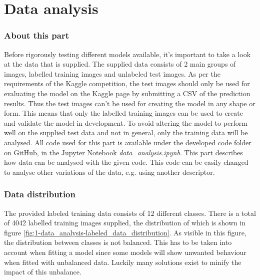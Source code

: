 \part{Data analysis}
\label{part:data_analysis}


\section{About this part}
\label{section:DA_about_part}
Before rigorously testing different models available, it's important to take a look at the data that is supplied. The supplied data consists of 2 main groups of images, labelled training images and unlabeled test images.
As per the requirements of the Kaggle competition, the test images should only be used for evaluating the model on the Kaggle page by submitting a CSV of the prediction results.
Thus the test images can't be used for creating the model in any shape or form.
This means that only the labelled training images can be used to create and validate the model in development.
To avoid altering the model to perform well on the supplied test data and not in general, only the training data will be analysed.
All code used for this part is available under the developed code folder on GitHub, in the Jupyter Notebook \emph{data\_analysis.ipynb}.
This part describes how data can be analysed with the given code.
This code can be easily changed to analyse other variations of the data, e.g. using another descriptor.


\section{Data distribution}
\label{section:DA_data_distribution}
The provided labeled training data consists of 12 different classes.
There is a total of 4042 labelled training images supplied, the distribution of which is shown in figure \ref{fig:1-data_analysis-labeled_data_distribution}.
As visible in this figure, the distribution between classes is not balanced.
This has to be taken into account when fitting a model since some models will show unwanted behaviour when fitted with unbalanced data.
Luckily many solutions exist to minify the impact of this unbalance.


